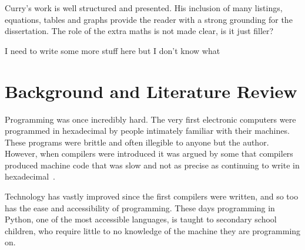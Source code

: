 \documentclass{article}[a4]
\begin{document}
Curry's work is well structured and presented. His inclusion of many listings, equations, tables and graphs provide the reader with a strong grounding for the dissertation. The role of the extra maths is not made clear, is it just filler?

I need to write some more stuff here but I don't know what




\section{Background and Literature Review} %
Programming was once incredibly hard. The very first electronic computers were programmed in hexadecimal by people intimately familiar with their machines. These programs were brittle and often illegible to anyone but the author. However, when compilers were introduced it was argued by some that compilers produced machine code that was slow and not as precise as continuing to write in hexadecimal~\cite{Jargon}.

Technology has vastly improved since the first compilers were written, and so too has the ease and accessibility of programming. These days programming in Python, one of the most accessible languages, is taught to secondary school children, who require little to no knowledge of the machine they are programming on.
\end{document}
